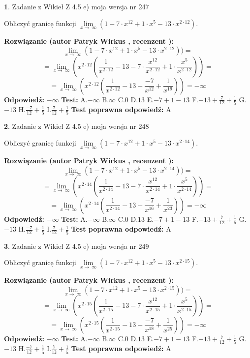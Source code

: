 \documentclass[12pt, a4paper]{article}
\theoremstyle{definition} %
\newtheorem{zad}{}
\newcommand{\zadStart}[1]{\begin{zad}#1\newline}
\newcommand{\zadStop}{\end{zad}}
\newcommand{\rozwStart}[2]{\noindent \textbf{Rozwiązanie (autor #1 , recenzent #2): }\newline}
\newcommand{\rozwStop}{\newline}
\newcommand{\odpStart}{\noindent \textbf{Odpowiedź:}\newline}
\newcommand{\odpStop}{\newline}
\newcommand{\testStart}{\noindent \textbf{Test:}\newline}
\newcommand{\testStop}{\newline}
\newcommand{\kluczStart}{\noindent \textbf{Test poprawna odpowiedź:}\newline}
\newcommand{\kluczStop}{\newline}
\begin{document}
\zadStart{Zadanie z Wikieł Z 4.5 e) moja wersja nr 247}



Obliczyć granicę funkcji  $\lim\limits_{x\to\ \infty}(1 - 7 \cdot x^{12}+1 \cdot x^{5}- 13 \cdot x^{2\cdot12})$.
\zadStop
\rozwStart{Patryk Wirkus}{}
$$\lim\limits_{x\to\ \infty}(1 - 7 \cdot x^{12}+1 \cdot x^{5}- 13 \cdot x^{2\cdot12}))=$$
$$=\lim\limits_{x\to\ \infty}(x^{2\cdot12}(\frac{1}{x^{2\cdot12}}-13 -7 \cdot \frac{x^{12}}{x^{2\cdot12}}+1 \cdot \frac{x^{5}}{x^{2\cdot12}}))=$$
$$=\lim\limits_{x\to\ \infty}(x^{2\cdot12}(\frac{1}{x^{2\cdot12}}-13 + \frac{-7}{x^{12}}+ \frac{1}{x^{19}}))=-\infty$$
\rozwStop
\odpStart
$-\infty$
\odpStop
\testStart
A.$-\infty$ B.$\infty$ C.$0$ D.$13$ E.$-7 + 1 - 13$
F.$-13+\frac{7}{12}+\frac{1}{5}$ G.$-13$
H.$\frac{-7}{12}+\frac{1}{5}$
I.$\frac{7}{12}+\frac{1}{5}$
\testStop
\kluczStart
A
\kluczStop



\zadStart{Zadanie z Wikieł Z 4.5 e) moja wersja nr 248}



Obliczyć granicę funkcji  $\lim\limits_{x\to\ \infty}(1 - 7 \cdot x^{12}+1 \cdot x^{5}- 13 \cdot x^{2\cdot14})$.
\zadStop
\rozwStart{Patryk Wirkus}{}
$$\lim\limits_{x\to\ \infty}(1 - 7 \cdot x^{12}+1 \cdot x^{5}- 13 \cdot x^{2\cdot14}))=$$
$$=\lim\limits_{x\to\ \infty}(x^{2\cdot14}(\frac{1}{x^{2\cdot14}}-13 -7 \cdot \frac{x^{12}}{x^{2\cdot14}}+1 \cdot \frac{x^{5}}{x^{2\cdot14}}))=$$
$$=\lim\limits_{x\to\ \infty}(x^{2\cdot14}(\frac{1}{x^{2\cdot14}}-13 + \frac{-7}{x^{16}}+ \frac{1}{x^{23}}))=-\infty$$
\rozwStop
\odpStart
$-\infty$
\odpStop
\testStart
A.$-\infty$ B.$\infty$ C.$0$ D.$13$ E.$-7 + 1 - 13$
F.$-13+\frac{7}{12}+\frac{1}{5}$ G.$-13$
H.$\frac{-7}{12}+\frac{1}{5}$
I.$\frac{7}{12}+\frac{1}{5}$
\testStop
\kluczStart
A
\kluczStop



\zadStart{Zadanie z Wikieł Z 4.5 e) moja wersja nr 249}



Obliczyć granicę funkcji  $\lim\limits_{x\to\ \infty}(1 - 7 \cdot x^{12}+1 \cdot x^{5}- 13 \cdot x^{2\cdot15})$.
\zadStop
\rozwStart{Patryk Wirkus}{}
$$\lim\limits_{x\to\ \infty}(1 - 7 \cdot x^{12}+1 \cdot x^{5}- 13 \cdot x^{2\cdot15}))=$$
$$=\lim\limits_{x\to\ \infty}(x^{2\cdot15}(\frac{1}{x^{2\cdot15}}-13 -7 \cdot \frac{x^{12}}{x^{2\cdot15}}+1 \cdot \frac{x^{5}}{x^{2\cdot15}}))=$$
$$=\lim\limits_{x\to\ \infty}(x^{2\cdot15}(\frac{1}{x^{2\cdot15}}-13 + \frac{-7}{x^{18}}+ \frac{1}{x^{25}}))=-\infty$$
\rozwStop
\odpStart
$-\infty$
\odpStop
\testStart
A.$-\infty$ B.$\infty$ C.$0$ D.$13$ E.$-7 + 1 - 13$
F.$-13+\frac{7}{12}+\frac{1}{5}$ G.$-13$
H.$\frac{-7}{12}+\frac{1}{5}$
I.$\frac{7}{12}+\frac{1}{5}$
\testStop
\kluczStart
A
\kluczStop
\end{document}
